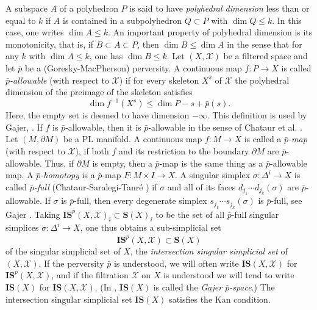 \documentclass{amsart}
\theoremstyle{definition}
\theoremstyle{remark}
\newcommand {\Xa}    {\ensuremath{\mathcal{X}}}
\newcommand {\bp}    {{\ensuremath{\bar{p}}}}
\newcommand {\sS}    {\mathbf{S}}
\newcommand {\sIS}   {\mathbf{IS}}
\begin{document}
A subspace $A$ of a polyhedron $P$ is said to have
\emph{polyhedral dimension} less than or equal to $k$ if
$A$ is contained in a subpolyhedron $Q\subset P$ with $\dim Q \leq k$.
In this case, one writes $\dim A \leq k$.
An important property of polyhedral dimension is its monotonicity,
that is, if $B \subset A \subset P$, then
$\dim B \leq \dim A$ in the sense that for any $k$ with $\dim A \leq k$,
one has $\dim B \leq k$.
Let $(X,\Xa)$ be a filtered space and
let $\bar{p}$ be a (Goresky-MacPherson) perversity.
A continuous map $f: P \to X$ is called
\emph{$\bp$-allowable} (with respect to $\Xa$) 
if for every skeleton $X^s$ of $\Xa$
the polyhedral dimension of the preimage of the skeleton satisfies
\[ \dim f^{-1} (X^s) \leq \dim P - s + \bar{p} (s). \]
Here, the empty set is deemed to have dimension $-\infty$.
This definition is used by Gajer, \cite[p. 943]{gajer}.
If $f$ is $\bp$-allowable, then it is $\bp$-allowable in the sense
of Chataur et al.  \cite[Def. 2.12, p. 9]{chataurst}.
Let $(M,\partial M)$ be a PL manifold.
A continuous map $f:M \to X$ is called a \emph{$\bp$-map}
(with respect to $\Xa$), if both $f$ and its restriction to the
boundary $\partial M$ are $\bp$-allowable.
Thus, if $\partial M$ is empty, then a $\bp$-map is the same thing
as a $\bp$-allowable map.
A \emph{$\bp$-homotopy} is a $\bp$-map $F: M\times I \to X$.
A singular simplex $\sigma: \Delta^i \to X$ is called \emph{$\bar{p}$-full}
(Chataur-Saralegi-Tanr\'e \cite[p. 10, Def. 3.1]{chataurst})
if $\sigma$ and all of its faces
$d_{j_1} \cdots d_{j_k} (\sigma)$ are $\bar{p}$-allowable.
If $\sigma$ is $\bar{p}$-full, then every degenerate simplex
$s_{j_1} \cdots s_{j_k} (\sigma)$ is $\bar{p}$-full,
see Gajer \cite[p. 945]{gajer}.
Taking $\sIS^{\bar{p}} (X,\Xa)_i \subset \sS (X)_i$ to be the set of all
$\bar{p}$-full singular simplices $\sigma: \Delta^i \to X$,
one thus obtains a sub-simplicial set
\[ \sIS^{\bar{p}} (X,\Xa) \subset \sS (X) \]
of the singular simplicial set of $X$, the
\emph{intersection singular simplicial set} of $(X,\Xa)$.
If the perversity $\bar{p}$ is understood, we will often write
$\sIS (X,\Xa)$ for $\sIS^{\bar{p}} (X,\Xa)$, and if the filtration 
$\Xa$ on $X$ is understood we will tend to write
$\sIS (X)$ for $\sIS (X,\Xa)$.
(In \cite{chataurst}, $\sIS (X)$ is called the \emph{Gajer $\bar{p}$-space}.)
The intersection singular simplicial set $\sIS (X)$ satisfies the
Kan condition.
\end{document}
